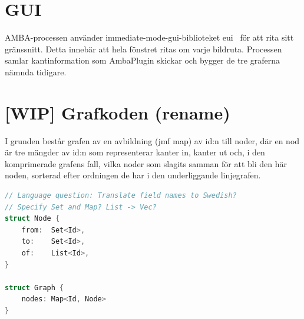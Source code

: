 

\section{GUI}
AMBA-processen använder immediate-mode-gui-biblioteket eui~\cite{egui}
för att rita sitt gränssnitt. Detta innebär att hela fönstret ritas om
varje bildruta. Processen samlar kantinformation som AmbaPlugin
skickar och bygger de tre graferna nämnda tidigare.

\section{[WIP] Grafkoden (rename)}
I grunden består grafen av en avbildning (jmf map) av id:n till noder,
där en nod är tre mängder av id:n som representerar kanter in, kanter
ut och, i den komprimerade grafens fall, vilka noder som slagits
samman för att bli den här noden, sorterad efter ordningen de har i
den underliggande linjegrafen.

\begin{lstlisting}[label={list:third}, language=Swift]
// Language question: Translate field names to Swedish?
// Specify Set and Map? List -> Vec?
struct Node {
    from:  Set<Id>,
    to:    Set<Id>,
    of:    List<Id>,
}

struct Graph {
    nodes: Map<Id, Node>
}
\end{lstlisting}

